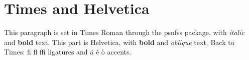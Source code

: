 \documentclass{article}
\begin{document}
\section{Times and Helvetica}
This paragraph is set in Times Roman through the psnfss package, with
\emph{italic} and \textbf{bold} text. {\sffamily This part is Helvetica,
with \textbf{bold} and \textit{oblique} text.} Back to Times: fi fl ffi
ligatures and \"a \'e \`o accents.
\end{document}
